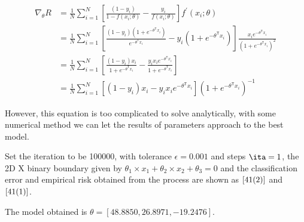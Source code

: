 \documentclass[a4paper,12pt]{article}
\begin{document}
\begin{align}
\nabla_{\theta}R &= \frac{1}{N} \sum^{N}_{i=1} \left[\frac{(1-y_i)}{1-f(x_i; \theta)} - \frac{y_i}{f(x_i; \theta)} \right] f^{'}(x_i;\theta) \nonumber\\
& = \frac{1}{N} \sum^{N}_{i=1} \left[ \frac{(1-y_i)(1+e^{-\theta^{\mathsf{T}}x_i})}{e^{-\theta^{\mathsf{T}}x_i}}  - y_i(1+e^{-\theta^{\mathsf{T}}x_i}) \right] \frac{x_i e^{-\theta^{\mathsf{T}}x_i}}{(1+e^{-\theta^{\mathsf{T}}x_i})^2} \nonumber\\
& = \frac{1}{N} \sum^{N}_{i=1} \left[ \frac{(1-y_i)x_i}{1+e^{-\theta^{\mathsf{T}}x_i}} - \frac{y_i x_i e^{-\theta^{\mathsf{T}}x_i}}{1+e^{-\theta^{\mathsf{T}}x_i}}  \right] \nonumber \\
& = \frac{1}{N} \sum^{N}_{i=1} \left[  (1-y_i)x_i - y_i x_i e^{-\theta^{\mathsf{T}}x_i}\right] (1+e^{-\theta^{\mathsf{T}}x_i})^{-1}   \nonumber
\end{align}

However, this equation is too complicated to solve analytically, with some numerical method we can let the results of parameters approach to the best model. 

Set the iteration to be 100000, with tolerance $\epsilon = 0.001$ and steps $\ita = 1$, the 2D X binary boundary given by $ \theta_1 \times x_1 + \theta_2 \times x_2  + \theta_3 = 0$ and the classification error and empirical risk obtained from the process are shown as $\ref{41(2)}$ and $\ref{41(1)}$.

The model obtained is $\theta = [48.8850, 26.8971, -19.2476]$.

\begin{figure}[h]
\setcounter{subfigure}{12}
\centering
{}
\end{figure}
\end{document}
